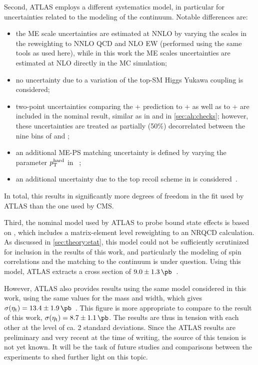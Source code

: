 Second, ATLAS employs a different systematics model, in particular for uncertainties related to the modeling of the \ttbar continuum. Notable differences are:
\begin{itemize}
\item the ME scale uncertainties are estimated at NNLO by varying the scales in the reweighting to NNLO QCD and NLO EW (performed using the same tools as used here), while in this work the ME scales uncertainties are estimated at NLO directly in the \powheg MC simulation;
\item no uncertainty due to a variation of the top-SM Higgs Yukawa coupling is considered;
\item two-point uncertainties comparing the \powheg+ \pythia prediction to \powheg+ \herwig as well as to \bbfourl+ \pythia are included in the nominal result, similar as in  and in \cref{sec:ah:checks}; however, these uncertainties are treated as partially (50\%) decorrelated between the nine bins of \chel and \chan;
\item an additional ME-PS matching uncertainty is defined by varying the parameter $p_{\mathrm{T}}^{\mathrm{hard}}$ in \pythia~\cite{Pythia:2022};
\item an additional uncertainty due to the top recoil scheme in \pythia is considered~\cite{Brooks:2019xso}.
\end{itemize}
In total, this results in significantly more degrees of freedom in the fit used by ATLAS than the one used by CMS.

Third, the nominal model used by ATLAS to probe \ttbar bound state effects is based on , which includes a matrix-element level reweighting to an NRQCD calculation. As discussed in \cref{sec:theory:etat}, this model could not be sufficiently scrutinized for inclusion in the results of this work, and particularly the modeling of spin correlations and the matching to the \ttbar continuum is under question. Using this model, ATLAS extracts a cross section of $9.0 \pm \SI{1.3}{\pb}$~\cite{ATLAS:CONF-2025-008}. 

However, ATLAS also provides results using the same \etat model considered in this work, using the same values for the \etat mass and width, which gives $\sigetat = 13.4 \pm \SI{1.9}{\pb}$~\cite{ATLAS:CONF-2025-008}. This figure is more appropriate to compare to the result of this work, $\sigetat = 8.7 \pm \SI{1.1}{\pb}$. The results are thus in tension with each other at the level of ca. 2 standard deviations. Since the ATLAS results are preliminary and very recent at the time of writing, the source of this tension is not yet known. It will be the task of future studies and comparisons between the experiments to shed further light on this topic.


